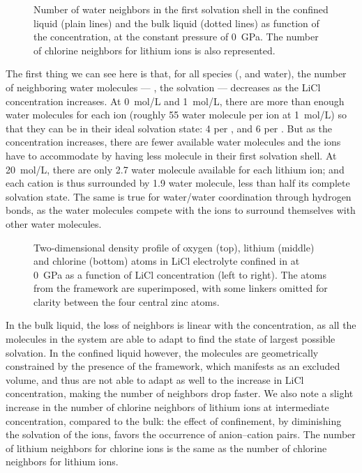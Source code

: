 \documentclass[thesis]{subfiles}
\begin{document}
\begin{figure}[ht]
    \centering
    
    \caption{Number of water neighbors in the first solvation shell in the
    confined liquid (plain lines) and the bulk liquid (dotted lines) as
    function of the concentration, at the constant pressure of \SI{0}{GPa}.
    The number of chlorine neighbors for lithium ions is also represented.}
    \label{fig:licl-zif:neighbors}
\end{figure}

The first thing we can see here is that, for all species (,  and
water), the number of neighboring water molecules --- \ie, the solvation ---
decreases as the LiCl concentration increases. At \SI{0}{mol/L} and
\SI{1}{mol/L}, there are more than enough water molecules for each ion (roughly
55 water molecule per ion at \SI{1}{mol/L}) so that they can be in their ideal
solvation state: 4  per , and 6  per . But as
the concentration increases, there are fewer available water molecules and the
ions have to accommodate by having less molecule in their first solvation shell.
At \SI{20}{mol/L}, there are only 2.7 water molecule available for each lithium
ion; and each cation is thus surrounded by 1.9 water molecule, less than half
its complete solvation state. The same is true for water/water coordination
through hydrogen bonds, as the water molecules compete with the ions to surround
themselves with other water molecules.

\begin{figure}[b]
    \centering
    
    \caption{Two-dimensional density profile of oxygen (top), lithium (middle) and
    chlorine (bottom) atoms in LiCl electrolyte confined in  at \SI{0}{GPa}
    as a function of LiCl concentration (left to right). The atoms from the
     framework are superimposed, with some linkers omitted for clarity
    between the four central zinc atoms.}
    \label{fig:licl-zif:density}
\end{figure}

In the bulk liquid, the loss of neighbors is linear with the concentration, as
all the molecules in the system are able to adapt to find the state of largest
possible solvation. In the confined liquid however, the molecules are
geometrically constrained by the presence of the  framework, which
manifests as an excluded volume, and thus are not able to adapt as well to the
increase in LiCl concentration, making the number of neighbors drop faster. We
also note a slight increase in the number of chlorine neighbors of lithium ions
at intermediate concentration, compared to the bulk: the effect of confinement,
by diminishing the solvation of the ions, favors the occurrence of anion--cation
pairs. The number of lithium neighbors for chlorine ions is the same as the
number of chlorine neighbors for lithium ions.
\end{document}

